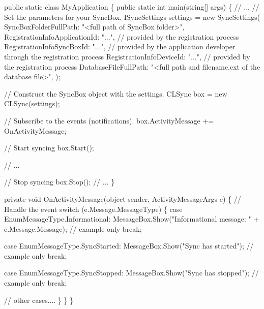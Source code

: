 \begin{DoxyCode}
\textcolor{keyword}{public} \textcolor{keyword}{static} \textcolor{keyword}{class }MyApplication
\{
    \textcolor{keyword}{public} \textcolor{keyword}{static} \textcolor{keywordtype}{int} main(\textcolor{keywordtype}{string}[] args)
    \{
        \textcolor{comment}{// ...}
        \textcolor{comment}{// Set the parameters for your SyncBox.}
        ISyncSettings settings = \textcolor{keyword}{new} SyncSettings(
            SyncBoxFolderFullPath: \textcolor{stringliteral}{"<full path of SyncBox folder>"},
            RegistrationInfoApplicationId: \textcolor{stringliteral}{"..."},   \textcolor{comment}{// provided by the
       registration process}
            RegistrationInfoSyncBoxId: \textcolor{stringliteral}{"..."},       \textcolor{comment}{// provided by the
       application developer through the registration process}
            RegistrationInfoDeviceId: \textcolor{stringliteral}{"..."},        \textcolor{comment}{// provided by the
       registration process}
            DatabaseFileFullPath: \textcolor{stringliteral}{"<full path and filename.ext of the database
       file>"},
                );
        
        \textcolor{comment}{// Construct the SyncBox object with the settings.}
        CLSync box = \textcolor{keyword}{new} CLSync(settings);

        \textcolor{comment}{// Subscribe to the events (notifications).}
        box.ActivityMessage += OnActivityMessage;
    
        \textcolor{comment}{// Start syncing}
        box.Start(); 
    
        \textcolor{comment}{// ...}
    
        \textcolor{comment}{// Stop syncing}
        box.Stop();
        \textcolor{comment}{// ...}
    \}

    \textcolor{keyword}{private} \textcolor{keywordtype}{void} OnActivityMessage(\textcolor{keywordtype}{object} sender, ActivityMessageArgs e)
    \{
        \textcolor{comment}{// Handle the event}
        \textcolor{keywordflow}{switch} (e.Message.MessageType)
        \{
            \textcolor{keywordflow}{case} EnumMessageType.Informational:
                MessageBox.Show(\textcolor{stringliteral}{"Informational message: "} + e.Message.Message);
        \textcolor{comment}{// example only}
                \textcolor{keywordflow}{break};

            \textcolor{keywordflow}{case} EnumMessageType.SyncStarted:
                MessageBox.Show(\textcolor{stringliteral}{"Sync has started"});    \textcolor{comment}{// example only}
                \textcolor{keywordflow}{break};

            \textcolor{keywordflow}{case} EnumMessageType.SyncStopped:
                MessageBox.Show(\textcolor{stringliteral}{"Sync has stopped"});    \textcolor{comment}{// example only}
                \textcolor{keywordflow}{break};

            \textcolor{comment}{// other cases....}
        \}
    \}
\}
\end{DoxyCode}


